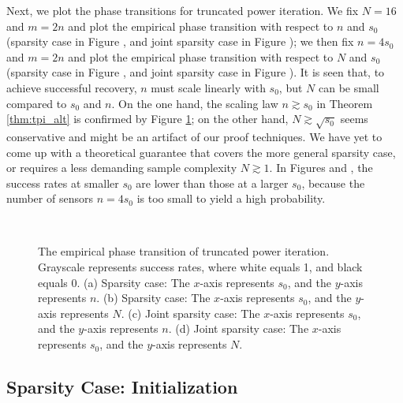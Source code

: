 \documentclass[11pt,journal]{IEEEtran}
\begin{document}
Next, we plot the phase transitions for truncated power iteration. We fix $N=16$ and $m=2n$ and plot the empirical phase transition with respect to $n$ and $s_0$ (sparsity case in Figure , and joint sparsity case in Figure ); we then fix $n=4s_0$ and $m=2n$ and plot the empirical phase transition with respect to $N$ and $s_0$ (sparsity case in Figure , and joint sparsity case in Figure ). It is seen that, to achieve successful recovery, $n$ must scale linearly with $s_0$, but $N$ can be small compared to $s_0$ and $n$. On the one hand, the scaling law $n\gtrsim s_0$ in Theorem \ref{thm:tpi_alt} is confirmed by Figure \ref{fig:tpi_pt}; on the other hand, $N\gtrsim \sqrt{s_0}$ seems conservative and might be an artifact of our proof techniques. We have yet to come up with a theoretical guarantee that covers the more general sparsity case, or requires a less demanding sample complexity $N\gtrsim 1$. In Figures  and , the success rates at smaller $s_0$ are lower than those at a larger $s_0$, because the number of sensors $n = 4s_0$ is too small to yield a high probability.

\begin{figure}[htbp]%
\centering
\subfloat[]{
\label{fig:tpi_pt_n}}
\subfloat[]{
\label{fig:tpi_pt_N}} \\
\subfloat[]{
\label{fig:js_tpi_pt_n}}
\subfloat[]{
\label{fig:js_tpi_pt_N}}
\caption{The empirical phase transition of truncated power iteration. Grayscale represents success rates, where white equals 1, and black equals 0.
(a) Sparsity case: The $x$-axis represents $s_0$, and the $y$-axis represents $n$. (b) Sparsity case: The $x$-axis represents $s_0$, and the $y$-axis represents $N$.
(c) Joint sparsity case: The $x$-axis represents $s_0$, and the $y$-axis represents $n$. (d) Joint sparsity case: The $x$-axis represents $s_0$, and the $y$-axis represents $N$.}%
\label{fig:tpi_pt}%
\end{figure}

\subsection{Sparsity Case: Initialization} \label{sec:exp_init}
\end{document}
